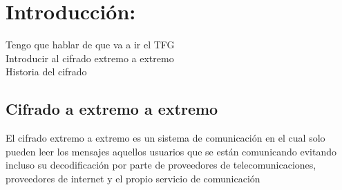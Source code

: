 \chapter{Introducción:}

Tengo que hablar de que va a ir el TFG \\
Introducir al cifrado extremo a extremo \\
Historia del cifrado\\

\section{Cifrado a extremo a extremo}
El cifrado extremo a extremo es un sistema de comunicación en el cual solo pueden leer los mensajes aquellos usuarios que se están comunicando evitando incluso su decodificación por parte de proveedores de telecomunicaciones, proveedores de internet y el propio servicio de comunicación

